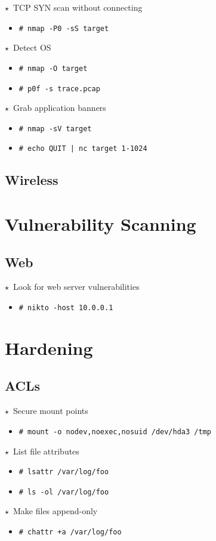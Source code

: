 \documentclass[10pt,landscape]{article}
\newcommand{\os}[1]{\texttt{\footnotesize{#1}}}
\newcommand{\bsd}{\os{B}}
\newcommand{\unix}{\os{U}}
\newcommand{\linux}{\os{L}}
\newenvironment{action}[1]
  {\begin{minipage}[c]{\linewidth}$\star$~#1\begin{itemize}[leftmargin=1cm]}
  {\end{itemize}\end{minipage}\vspace*{3pt}}
\newcommand{\cmd}[2]{\item[#1] {\small\tt\# #2}}
\begin{document}
\begin{multicols*}{3}
\begin{action}{TCP SYN scan without connecting}
\cmd{\unix}{nmap -P0 -sS target}
\end{action}

\begin{action}{Detect OS}
\cmd{\unix}{nmap -O target}
\cmd{\unix}{p0f -s trace.pcap}
\end{action}

\begin{action}{Grab application banners}
\cmd{\unix}{nmap -sV target}
\cmd{\unix}{echo QUIT | nc target 1-1024}
\end{action}

\subsection*{Wireless}

\section*{Vulnerability Scanning}

\subsection*{Web}
\begin{action}{Look for web server vulnerabilities}
\cmd{\unix}{nikto -host 10.0.0.1}
\end{action}

\section*{Hardening}

\subsection*{ACLs}

\begin{action}{Secure mount points}
\cmd{\unix}{mount -o nodev,noexec,nosuid /dev/hda3 /tmp}
\end{action}

\begin{action}{List file attributes}
\cmd{\linux}{lsattr /var/log/foo}
\cmd{\bsd}{ls -ol /var/log/foo}
\end{action}

\begin{action}{Make files append-only}
\cmd{\linux}{chattr +a /var/log/foo}
\end{action}


\end{multicols*}
\end{document}
